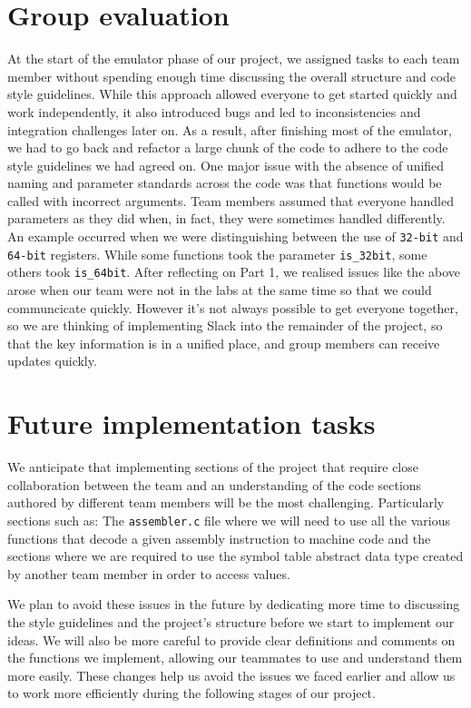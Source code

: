 \documentclass[11pt]{article}
\begin{document}
\section{Group evaluation}
At the start of the emulator phase of our project, we assigned tasks to each team member without spending enough time discussing the overall structure and code style guidelines. While this approach allowed everyone to get started quickly and work independently, it also introduced bugs and led to inconsistencies and integration challenges later on. As a result, after finishing most of the emulator, we had to go back and refactor a large chunk of the code to adhere to the code style guidelines we had agreed on. One major issue with the absence of unified naming and parameter standards across the code was that functions would be called with incorrect arguments. Team members assumed that everyone handled parameters as they did when, in fact, they were sometimes handled differently. An example occurred when we were distinguishing between the use of \texttt{32-bit} and \texttt{64-bit} registers. While some functions took the parameter \texttt{is\_32bit}, some others took \texttt{is\_64bit}. After reflecting on Part 1, we realised issues like the above arose when our team were not in the labs at the same time so that we could communcicate quickly. However it's not always possible to get everyone together, so we are thinking of implementing Slack into the remainder of the project, so that the key information is in a unified place, and group members can receive updates quickly.

\section{Future implementation tasks}

We anticipate that implementing sections of the project that require close collaboration between the team and an understanding of the code sections authored by different team members will be the most challenging. Particularly sections such as:
The \texttt{assembler.c} file where we will need to use all the various functions that decode a given assembly instruction to machine code and the sections where we are required to use the symbol table abstract data type created by another team member in order to access values.

We plan to avoid these issues in the future by dedicating more time to discussing the style guidelines and the project's structure before we start to implement our ideas. We will also be more careful to provide clear definitions and comments on the functions we implement, allowing our teammates to use and understand them more easily. These changes help us avoid the issues we faced earlier and allow us to work more efficiently during the following stages of our project.
 
\end{document}
